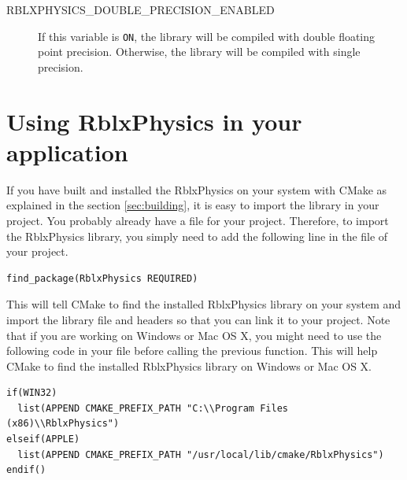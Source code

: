 \documentclass[a4paper,12pt]{article}
\begin{document}
\begin{description}
          \item[RBLXPHYSICS\_DOUBLE\_PRECISION\_ENABLED] If this variable is \texttt{ON}, the library will be compiled with double floating point precision.
                                                                    Otherwise, the library will be compiled with single precision.
       \end{description}

    \section{Using RblxPhysics in your application}

    If you have built and installed the RblxPhysics on your system with CMake as explained in the section \ref{sec:building}, it is easy to import the
    library in your project. You probably already have a  file for your project. Therefore, to import the RblxPhysics
    library, you simply need to add the following line in the  file of your project.

    \lstset{style=customcmake}

    \vspace{0.6cm}

    \begin{lstlisting}
find_package(RblxPhysics REQUIRED)
    \end{lstlisting}

    \vspace{0.6cm}

    This will tell CMake to find the installed RblxPhysics library on your system and import the library file and headers so that you can
    link it to your project. Note that if you are working on Windows or Mac OS X, you might need to use the following code in your  file
    before calling the previous function. This will help CMake to find the installed RblxPhysics library on Windows or Mac OS X. 

    \vspace{0.6cm}

    \begin{lstlisting}
if(WIN32)
  list(APPEND CMAKE_PREFIX_PATH "C:\\Program Files (x86)\\RblxPhysics")
elseif(APPLE)
  list(APPEND CMAKE_PREFIX_PATH "/usr/local/lib/cmake/RblxPhysics")
endif()
    \end{lstlisting}

    \vspace{0.6cm}
\end{document}
